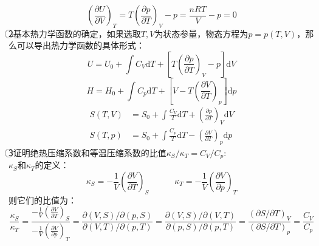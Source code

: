 \documentclass[12pt]{article}
\begin{document}
\begin{equation}
	{{(\frac{\partial U}{\partial V})}_{T}}=T{{(\frac{\partial p}{\partial T})}_{V}}-p=\frac{nRT}{V}-p=0
\end{equation}
\textcircled{2}基本热力学函数的确定，如果选取$T,V$为状态参量，物态方程为$p=p(T,V)$，那么可以导出热力学函数的具体形式：
\begin{equation}
	U=U_0+\int C_V\mathrm{d}T+[T(\frac{\partial p}{\partial T})_V-p]\mathrm{d}V
\end{equation}
\begin{equation}
	H=H_0+\int C_p\mathrm{d}T+[V-T(\frac{\partial V}{\partial T})_p]\mathrm{d}p
\end{equation}
\begin{equation}
	\begin{split}
		S(T,V)&=S_0+\int \frac{C_V}{T}\mathrm{d}T+(\frac{\partial p}{\partial T})_V\mathrm{d}V\\
		S(T,p)&=S_0+\int \frac{C_p}{T}\mathrm{d}T-(\frac{\partial V}{\partial T})_p\mathrm{d}p
	\end{split}
\end{equation}
\textcircled{3}证明绝热压缩系数和等温压缩系数的比值$\kappa_S/\kappa_{T}=C_V/C_p$:\\
$\kappa_S$和$\kappa_{T}$的定义：
\begin{equation}
	\kappa_S=-\frac{1}{V}(\frac{\partial V}{\partial T})_S\quad \quad \quad \kappa_T=-\frac{1}{V}(\frac{\partial V}{\partial p})_T
\end{equation}
则它们的比值为：
\begin{equation}
	\frac{\kappa_S}{\kappa_T}=\frac{-\frac{1}{V}(\frac{\partial V}{\partial T})_S}{-\frac{1}{V}(\frac{\partial V}{\partial p})_T}=\frac{\partial(V,S)/\partial(p,S)}{\partial (V,T)/\partial (p,T)}=\frac{\partial(V,S)/\partial(V,T)}{\partial(p,S)/\partial(p,T)}=\frac{(\partial S/\partial T)_V}{(\partial S/\partial T)_p}=\frac{C_V}{C_p}
\end{equation}
\end{document}
